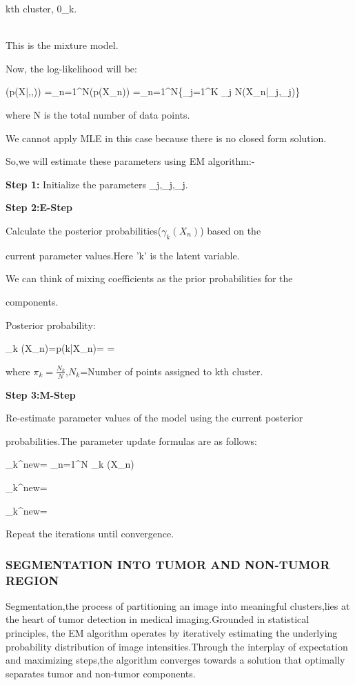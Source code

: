 kth cluster, 0\le\pi_{k}.\
               
\\This is the mixture model.

Now, the log-likelihood will be:

\ln(p(X|\mu,\Sigma,\pi))
=\sum_{n=1}^{N}\ln(p(X_n))
=\sum_{n=1}^{N}\ln\{\sum_{j=1}^{K} \pi_{j} N(X_n|\mu_{j},\Sigma_{j})\}

        where N is the total number of data points.

We cannot apply MLE in this case because there is no closed form solution.


So,we will estimate these parameters using EM algorithm:-

\textbf{Step 1:} Initialize the parameters \mu_{j},\Sigma_{j},\pi_{j}.

\textbf{Step 2:E-Step} 

Calculate the posterior probabilities($\gamma_{k} (X_{n})$) based on the 

current parameter values.Here 'k' is the latent variable.

We can think of mixing coefficients as the prior probabilities for the 

components.

Posterior probability:

\gamma_{k} (X_{n})=p(k|X_{n})=
                             =

                             where $\pi_{k}=\frac{N_{k}}{N}$,$N_{k}$=Number of points assigned to kth cluster.

\textbf{Step 3:M-Step} 

Re-estimate parameter values of the model using the current posterior 

probabilities.The parameter update formulas are as follows:

{\pi_{k}}^{new}= \sum_{n=1}^{N} \gamma_{k} (X_{n})

{\mu_{k}}^{new}=

{\Sigma_{k}}^{new}=

Repeat the iterations until convergence.\\


\subsubsection{SEGMENTATION INTO TUMOR AND NON-TUMOR REGION}
Segmentation,the process of partitioning an image into meaningful clusters,lies at the heart of tumor detection in medical imaging.Grounded in statistical principles, the EM algorithm operates by iteratively estimating the underlying probability distribution of image intensities.Through the interplay of expectation and maximizing steps,the algorithm converges towards a solution that optimally separates tumor and non-tumor components.




